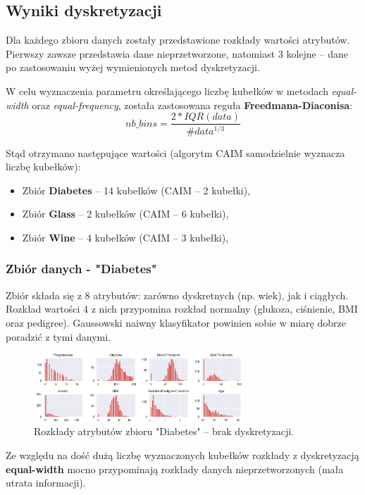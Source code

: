 \subsection{Wyniki dyskretyzacji}
Dla każdego zbioru danych zostały przedstawione rozkłady wartości atrybutów. Pierwszy zawsze
przedstawia dane nieprzetworzone, natomiast 3 kolejne -- dane po zastosowaniu wyżej wymienionych
metod dyskretyzacji.

W celu wyznaczenia parametru określającego liczbę kubełków w metodach \textit{equal-width}
oraz \textit{equal-frequency}, została zastosowana reguła
\textbf{Freedmana-Diaconisa}:
    $$ nb\_bins = \frac{2 * IQR(data)}{\#data^{1/3}}$$

Stąd otrzymano następujące wartości (algorytm CAIM samodzielnie wyznacza liczbę kubełków):
\begin{itemize}
    \item{Zbiór \textbf{Diabetes} -- 14 kubełków (CAIM -- 2 kubełki),}
    \item{Zbiór \textbf{Glass} -- 2 kubełków (CAIM -- 6 kubełki),}
    \item{Zbiór \textbf{Wine} -- 4 kubełków (CAIM -- 3 kubełki),}
\end{itemize}


\subsubsection{Zbiór danych - "Diabetes"}
    Zbiór składa się z 8 atrybutów: zarówno dyskretnych (np. wiek), jak i ciągłych.
    Rozkład wartości 4 z nich przypomina rozkład normalny (glukoza, ciśnienie, BMI
    oraz pedigree). Gaussowski naiwny klasyfikator powinien sobie w miarę dobrze poradzić
    z tymi danymi.

    \begin{figure}[H]
        \center
        \includegraphics[width=0.7\textwidth]{img/discretization/non_discretized_diabetes.png}
        \caption{Rozkłady atrybutów zbioru "Diabetes" -- brak dyskretyzacji.}
    \end{figure}

    Ze względu na dość dużą liczbę wyznaczonych kubełków rozkłady z dyskretyzacją
    \textbf{equal-width} mocno przypominają rozkłady danych nieprzetworzonych (mała
    utrata informacji).

